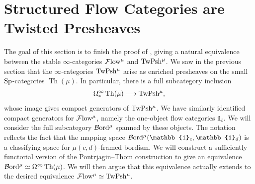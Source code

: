 \documentclass[10pt]{amsart}
\numberwithin{equation}{section}
\newtheorem{theorem}[prop]{Theorem}
\theoremstyle{definition}
\DeclareMathOperator{\Pic}{Pic}
\DeclareMathOperator{\Th}{Th}
\newcommand{\Flow}{\cF\mathrm{low}\vphantom{w}}
\newcommand{\Bord}{\mathcal{B}\mathrm{ord}\vphantom{d}}
\newcommand{\TwShv}{\mathrm{TwPsh}\vphantom{h}}
\newcommand{\bS}{\mathbb{S}}
\newcommand{\bR}{\mathbb{R}}
\newcommand{\bOne}{\mathbb{1}}
\newcommand{\cF}{\mathcal{F}}
\newcommand{\Sp}{\mathrm{Sp}\vphantom{p}}
\renewcommand{\to}{\mathchoice{\longrightarrow}{\rightarrow}{}{}}
\begin{document}

\section{Structured Flow Categories are Twisted Presheaves}\label{sec:structured_flow_categories_and_twisted_presheaves}

The goal of this section is to finish the proof of , giving a natural equivalence between the stable $\infty$-categories $\Flow^{\mu}$ and $\TwShv^{\mu}$.
We saw in the previous section that the $\infty$-categories $\TwShv^{\mu}$ arise as enriched presheaves on the small $\Sp$-categories $\Th(\mu)$.
In particular, there is a full subcategory inclusion
\begin{align*}
	\Omega^{\infty}_{*}\Th(\mu) \to \TwShv^{\mu},
\end{align*}
whose image gives compact generators of $\TwShv^{\mu}$.
We have similarly identified compact generators for $\Flow^{\mu}$, namely the one-object flow categories $\bOne_{b}$.
We will consider the full subcategory $\Bord^{\mu}$ spanned by these objects.
The notation reflects the fact that the mapping space $\Bord^{\mu}(\bOne_{c},\bOne_{d})$ is a classifying space for $\mu(c,d)$-framed bordism.
We will construct a sufficiently functorial version of the Pontrjagin--Thom construction to give an equivalence $\Bord^{\mu} \simeq \Omega^{\infty}\Th(\mu)$.
We will then argue that this equivalence actually extends to the desired equivalence $\Flow^{\mu}\simeq\TwShv^{\mu}$.
\end{document}
